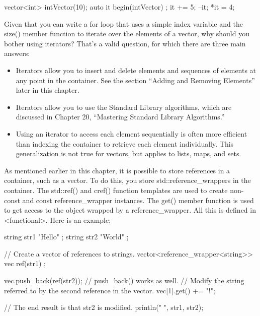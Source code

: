 \begin{cpp}
vector<int> intVector(10);
auto it { begin(intVector) };
it += 5;
--it;
*it = 4;
\end{cpp}


Given that you can write a for loop that uses a simple index variable and the size() member function to iterate over the elements of a vector, why should you bother using iterators? That’s a valid question, for which there are three main answers:

\begin{itemize}
\item
Iterators allow you to insert and delete elements and sequences of elements at any point in the container. See the section “Adding and Removing Elements” later in this chapter.

\item
Iterators allow you to use the Standard Library algorithms, which are discussed in Chapter 20, “Mastering Standard Library Algorithms.”

\item
Using an iterator to access each element sequentially is often more efficient than indexing the container to retrieve each element individually. This generalization is not true for vectors, but applies to lists, maps, and sets.
\end{itemize}


As mentioned earlier in this chapter, it is possible to store references in a container, such as a vector. To do this, you store std::reference\_wrappers in the container. The std::ref() and cref() function templates are used to create non-const and const reference\_wrapper instances. The get() member function is used to get access to the object wrapped by a reference\_wrapper. All this is defined in <functional>. Here is an example:

\begin{cpp}
string str1 { "Hello" };
string str2 { "World" };

// Create a vector of references to strings.
vector<reference_wrapper<string>> vec { ref(str1) };

vec.push_back(ref(str2)); // push_back() works as well.
// Modify the string referred to by the second reference in the vector.
vec[1].get() += "!";

// The end result is that str2 is modified.
println("{} {}", str1, str2);
\end{cpp}

